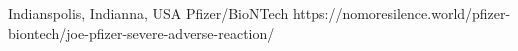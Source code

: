           {Indianspolis, Indianna, USA}
          {}
          {Pfizer/BioNTech}
          {}
          {}
          {https://nomoresilence.world/pfizer-biontech/joe-pfizer-severe-adverse-reaction/}
